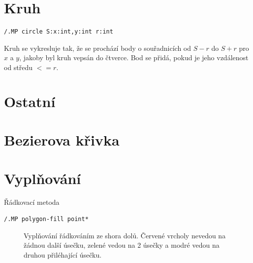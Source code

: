 \documentclass[a4paper,12pt]{book}
\begin{document}
\section{Kruh}
\begin{lstlisting}
/.MP circle S:x:int,y:int r:int
\end{lstlisting}
Kruh se vykresluje tak, že se prochází body o souřadnicích od $S-r$ do $S+r$ pro $x$ a $y$, jakoby byl kruh vepsán do čtverce. Bod se přidá, pokud je jeho vzdálenost od středu $<=r$.



\section{Ostatní}

\section{Bezierova křivka}

\section{Vyplňování} %

Řádkovací metoda

\begin{lstlisting}
/.MP polygon-fill point* 
\end{lstlisting}


\begin{figure}[H]
  \centering
  
  \caption{Vyplňování řádkováním ze shora dolů. Červené vrcholy nevedou na žádnou další úsečku, zelené vedou na 2 úsečky a modré vedou na druhou přiléhající úsečku.}
\end{figure}
\end{document}
